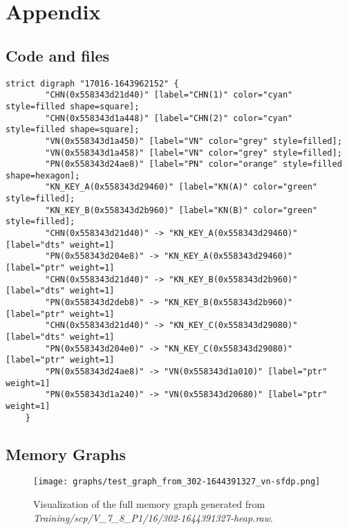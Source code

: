 \chapter*{Appendix}

\section{Code and files}

\begin{lstlisting}[style=text, caption={The DOT file of uncompressed block memgraph, here \textit{Training/basic/V\_7\_1\_P1/24/17016-1643962152-heap.raw}, with real addresses. Output is cropped.}, label={appendix:dot:17016-1643962152:cropped}]
    strict digraph "17016-1643962152" {
        "CHN(0x558343d21d40)" [label="CHN(1)" color="cyan" style=filled shape=square];
        "CHN(0x558343d1a448)" [label="CHN(2)" color="cyan" style=filled shape=square];
        "VN(0x558343d1a450)" [label="VN" color="grey" style=filled];
        "VN(0x558343d1a458)" [label="VN" color="grey" style=filled];
        "PN(0x558343d24ae8)" [label="PN" color="orange" style=filled shape=hexagon];
        "KN_KEY_A(0x558343d29460)" [label="KN(A)" color="green" style=filled];
        "KN_KEY_B(0x558343d2b960)" [label="KN(B)" color="green" style=filled];
        "CHN(0x558343d21d40)" -> "KN_KEY_A(0x558343d29460)" [label="dts" weight=1]
        "PN(0x558343d204e8)" -> "KN_KEY_A(0x558343d29460)" [label="ptr" weight=1]
        "CHN(0x558343d21d40)" -> "KN_KEY_B(0x558343d2b960)" [label="dts" weight=1]
        "PN(0x558343d2deb8)" -> "KN_KEY_B(0x558343d2b960)" [label="ptr" weight=1]
        "CHN(0x558343d21d40)" -> "KN_KEY_C(0x558343d29080)" [label="dts" weight=1]
        "PN(0x558343d204e0)" -> "KN_KEY_C(0x558343d29080)" [label="ptr" weight=1]
        "PN(0x558343d24ae8)" -> "VN(0x558343d1a010)" [label="ptr" weight=1]
        "PN(0x558343d1a240)" -> "VN(0x558343d20680)" [label="ptr" weight=1]
    }
\end{lstlisting}

\section{Memory Graphs}

\begin{figure}[H]\label{appendix:mem_graph:302-1644391327:full}
    \centering
    \texttt{[image: graphs/test\_graph\_from\_302-1644391327\_vn-sfdp.png]}
    \caption{Visualization of the full memory graph generated from \textit{Training/scp/V\_7\_8\_P1/16/302-1644391327-heap.raw}.}
\end{figure}


